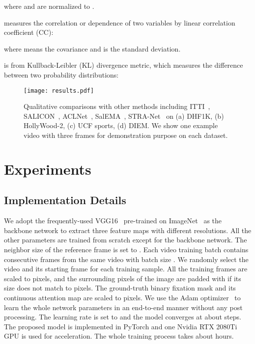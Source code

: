 \documentclass[review]{elsarticle}
\begin{document}
where  and  are normalized to .

  measures the correlation or dependence of two variables by linear correlation coefficient (CC):

where  means the covariance and  is the standard deviation.

 is from Kullback-Leibler (KL) divergence metric, which measures the difference between two probability distributions:




\begin{figure*}[t]
\centering
\texttt{[image: results.pdf]}
\caption{Qualitative comparisons with other methods including ITTI~\cite{itti1998model}, SALICON~\cite{huang2015salicon}, ACLNet~\cite{wang2018revisiting}, SalEMA~\cite{linardos2019simple}, STRA-Net~\cite{lai2019video} on (a) DHF1K, (b) HollyWood-2, (c) UCF sports, (d) DIEM. We show one example video with three frames for demonstration purpose on each dataset.}
\label{results}
\end{figure*}


\section{Experiments}
\subsection{Implementation Details}
We adopt the frequently-used VGG16~\cite{simonyan2014very} pre-trained on ImageNet~\cite{krizhevsky2012imagenet} as the backbone network to extract three feature maps with different resolutions.
All the other parameters are trained from scratch except for the backbone network.
The neighbor size of the reference frame is set to .
Each video training batch contains  consecutive frames from the same video with batch size .
We randomly select the video and its starting frame for each training sample.
All the training frames are scaled to  pixels, and the surrounding pixels of the image are padded with  if its size does not match to  pixels.
The ground-truth binary fixation mask and its continuous attention map are scaled to  pixels.
We use the Adam optimizer~\cite{kingma2014adam} to learn the whole network parameters  in an end-to-end manner without any post processing.
The learning rate is set to  and the model converges at about  steps.
The proposed model is implemented in PyTorch and one Nvidia RTX 2080Ti GPU is used for acceleration.
The whole training process takes about  hours.
\end{document}
